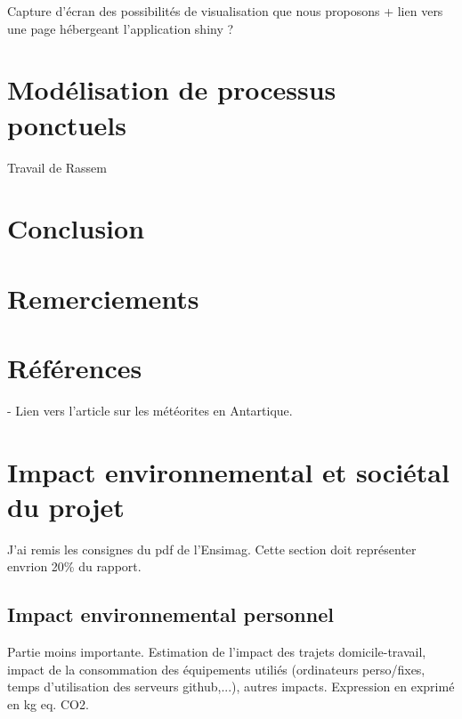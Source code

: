 \documentclass[12pt]{article}
\begin{document}
Capture d'écran des possibilités de visualisation que nous proposons + lien vers une page hébergeant l'application shiny ?

\section{Modélisation de processus ponctuels}
Travail de Rassem

\section{Conclusion}
\section{Remerciements}
\section{Références}
\printbibliography
- Lien vers l'article sur les météorites en Antartique.
\section{Impact environnemental et sociétal du projet}
J'ai remis les consignes du pdf de l'Ensimag. Cette section doit représenter envrion 20\% du rapport.
\subsection{Impact environnemental personnel}
Partie moins importante.
Estimation de l'impact des trajets domicile-travail, impact de la consommation des équipements utiliés (ordinateurs perso/fixes, temps d'utilisation des serveurs github,...), autres impacts.
Expression en exprimé en kg eq. CO2.
\end{document}
